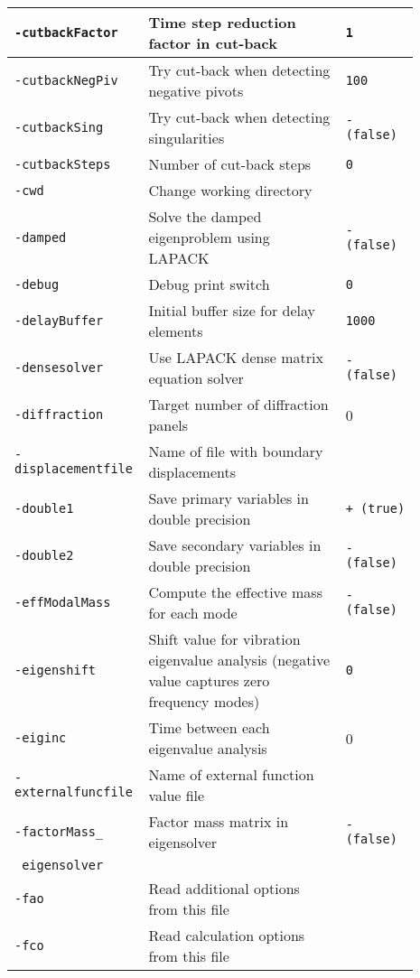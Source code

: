 {\begin{tabular}{|>{\raggedright} p{0.23\linewidth}| p{0.48\linewidth}| p{0.18\linewidth}|}
  \hline
  \texttt{-cutbackFactor} &    Time step reduction factor in cut-back    &   \texttt{1}  \\
  \hline
  \texttt{-cutbackNegPiv} &    Try cut-back when detecting negative pivots    &   \texttt{100}  \\
  \hline
  \texttt{-cutbackSing} &      Try cut-back when detecting singularities  &   \texttt{- (false)}  \\
  \hline
  \texttt{-cutbackSteps} &     Number of cut-back steps   &   \texttt{0}  \\
  \hline
  \texttt{-cwd} &    Change working directory  &    \\
  \hline
  {\tt-damped} & Solve the damped eigenproblem using LAPACK & {\tt- (false)} \\
  \hline
  \texttt{-debug} &    Debug print switch  & \texttt{0}  \\
  \hline
  \texttt{-delayBuffer} &    Initial buffer size for delay elements  & \texttt{1000}  \\
  \hline
  \texttt{-densesolver} &    Use LAPACK dense matrix equation solver  &   \texttt{- (false)}  \\
  \hline
  \texttt{-diffraction} &    Target number of diffraction panels &  0  \\
  \hline
  \texttt{-displacementfile} &    Name of file with boundary displacements &   \\
  \hline
  \texttt{-double1} &    Save primary variables in double precision  & \texttt{+ (true) } \\
  \hline
  \texttt{-double2} &    Save secondary variables in double precision &   \texttt{- (false)}  \\
  \hline
  \texttt{-effModalMass}  &    Compute the effective mass for each mode  & \texttt{- (false)}  \\
  \hline
 \texttt{-eigenshift}  &     Shift value for vibration eigenvalue analysis
                              (negative value captures zero frequency modes)   & \texttt{0}  \\
  \hline
  \texttt{-eiginc}  &     Time between each eigenvalue analysis  & 0  \\
  \texttt{-externalfuncfile}  &     Name of external function value file &   \\
  \hline
  \texttt{-factorMass\_}  &   Factor mass matrix in eigensolver   & \texttt{- (false)} \\
  \texttt{ eigensolver}   &                                       &                    \\
  \hline
  \texttt{-fao}  &     Read additional options from this file &   \\
  \hline
  \texttt{-fco}  &     Read calculation options from this file &   \\
  \hline
\end{tabular}}

